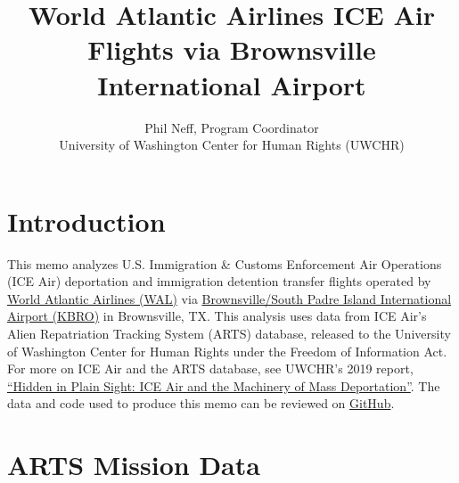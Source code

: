 \documentclass[a4paper,11pt,final]{article}
\begin{document}
\title{World Atlantic Airlines ICE Air Flights via Brownsville International Airport}\author{Phil Neff, Program Coordinator\\University of Washington Center for Human Rights (UWCHR)}\maketitle

\section{Introduction}

This memo analyzes U.S. Immigration \& Customs Enforcement Air
Operations (ICE Air) deportation and immigration detention transfer
flights operated by \href{https://www.flywaa.com/\#tf-home}{World
Atlantic Airlines (WAL)} via
\href{https://www.airnav.com/airport/KBRO}{Brownsville/South Padre
Island International Airport (KBRO)} in Brownsville, TX. This analysis
uses data from ICE Air's Alien Repatriation Tracking System (ARTS)
database, released to the University of Washington Center for Human
Rights under the Freedom of Information Act. For more on ICE Air and the
ARTS database, see UWCHR's 2019 report,
\href{https://jsis.washington.edu/humanrights/2019/04/23/ice-air/}{``Hidden
in Plain Sight: ICE Air and the Machinery of Mass Deportation''}. The
data and code used to produce this memo can be reviewed on
\href{https://github.com/UWCHR/ice-air}{GitHub}.

\section{ARTS Mission Data}
\end{document}

